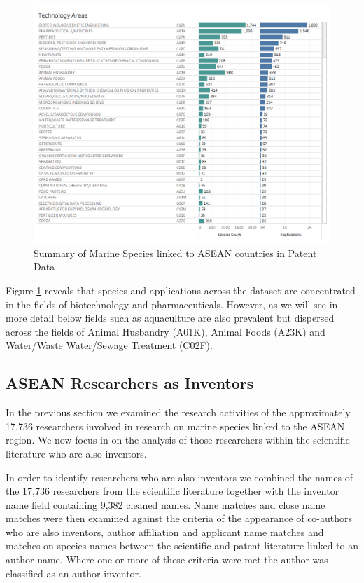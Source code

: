 \documentclass[openany]{book}
\theoremstyle{definition}
\theoremstyle{definition}
\theoremstyle{definition}
\theoremstyle{remark}
\begin{document}
\begin{figure}

{\centering \includegraphics[width=1\linewidth]{images-patents/technology_areas_species} 

}

\caption{Summary of Marine Species linked to ASEAN countries in Patent Data}\label{fig:patentspeciestechnology}
\end{figure}

Figure \ref{fig:patentspeciestechnology} reveals that species and
applications across the dataset are concentrated in the fields of
biotechnology and pharmaceuticals. However, as we will see in more
detail below fields such as aquaculture are also prevalent but dispersed
across the fields of Animal Husbandry (A01K), Animal Foods (A23K) and
Water/Waste Water/Sewage Treatment (C02F).

\hypertarget{asean-researchers-as-inventors}{%
\subsection{ASEAN Researchers as
Inventors}\label{asean-researchers-as-inventors}}

In the previous section we examined the research activities of the
approximately 17,736 researchers involved in research on marine species
linked to the ASEAN region. We now focus in on the analysis of those
researchers within the scientific literature who are also inventors.

In order to identify researchers who are also inventors we combined the
names of the 17,736 researchers from the scientific literature together
with the inventor name field containing 9,382 cleaned names. Name
matches and close name matches were then examined against the criteria
of the appearance of co-authors who are also inventors, author
affiliation and applicant name matches and matches on species names
between the scientific and patent literature linked to an author name.
Where one or more of these criteria were met the author was classified
as an author inventor.
\end{document}
